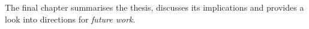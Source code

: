 \begin{quote}
\end{quote}

\begin{quote}
\end{quote}


The final chapter summarises the thesis, discusses its implications and provides a look into directions for \textit{future work}.







\cleardoublepage

 